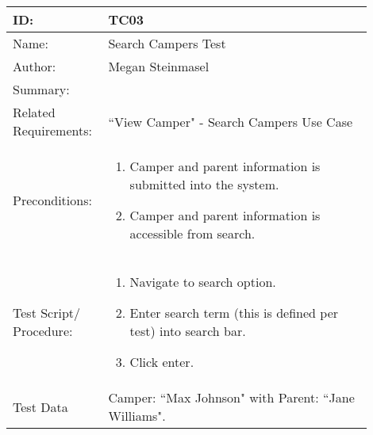 \documentclass[11pt]{article}
\begin{document}
\begin{table}[H]
\begin{center}
\begin{tabular}{p{0.20\linewidth}p{0.70\linewidth}}
	ID: & TC03\\\hline
	Name: & Search Campers Test \\\hline
	Author: & Megan Steinmasel\\\hline
	Summary: &  \\\hline
	Related \hspace{5em} Requirements:& ``View Camper" - Search Campers Use Case\\\hline
	Preconditions:& \begin{enumerate}[topsep=0pt]
		\item Camper and parent information is submitted into the system.
		\item Camper and parent information is accessible from search.
	\end{enumerate}\\\hline
	Test Script/ Procedure: & \begin{enumerate}[topsep=0pt]
	\item Navigate to search option.
	\item Enter search term (this is defined per test) into search bar.
	\item Click enter.
	\end{enumerate}\\\hline
	Test Data & Camper: ``Max Johnson" with Parent: ``Jane Williams".
\end{tabular}
\label{des:}	
\end{center}
\end{table}
\end{document}
